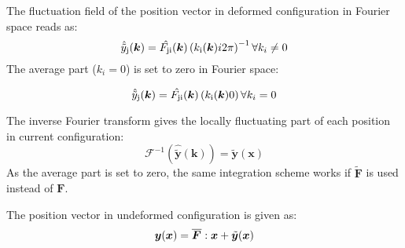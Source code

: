 \documentclass[a4paper,12pt]{article}
\newcommand{\tnsr}[1]{\ensuremath{\bm{{#1}}}}
\newcommand{\vctr}[1]{\ensuremath{\bm{#1}}}
\newcommand{\F}[1][]{\ensuremath{\tnsr F^{{\rm #1}}}}
\begin{document}
The fluctuation field of the position vector in deformed configuration in Fourier space reads as:
\begin{equation}
\hat{\tilde{y}}_{\rm j}(\vctr k) = \hat{F_{\rm ji}}(\vctr k) \left(k_{\rm i}(\vctr k) i 2 \pi \right)^{-1} \forall k_i \neq 0
\end{equation}
The average part ($k_i=0$) is set to zero in Fourier space:

\begin{equation}
\hat{\tilde{y}}_{\rm j}(\vctr k) = \hat{F_{\rm ji}}(\vctr k) \left(k_{\rm i}(\vctr k) 0 \right) \forall k_i = 0
\end{equation}

The inverse Fourier transform gives the locally fluctuating part of each position in current configuration:
\begin{equation}
\mathcal{F}^{-1}\left(\hat{\tilde{\vctr y}}(\vctr k) \right) = \tilde{\vctr y}(\vctr x)
\end{equation}
As the average part is set to zero, the same integration scheme works if $\tilde{\tnsr F}$ is used instead of ${\tnsr F}$.

The position vector in undeformed configuration is given as:
\begin{equation}
\vctr y(\vctr x) = \overline{\F}: \vctr x + \tilde{\vctr y}(\vctr x)
\end{equation}
\end{document}
